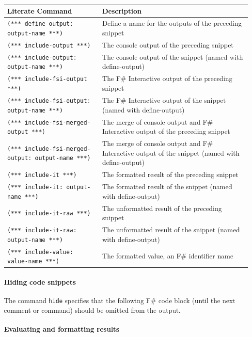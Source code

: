 \documentclass{article}
\begin{document}
\begin{tabular}{|l|l|}\hline
\textbf{Literate Command} & \textbf{Description}\\ \hline\hline
\texttt{(*** define-output: output-name ***)} & Define a name for the outputs of the preceding snippet\\ \hline
\texttt{(*** include-output ***)} & The console output of the preceding snippet\\ \hline
\texttt{(*** include-output: output-name ***)} & The console output of the snippet (named with define-output)\\ \hline
\texttt{(*** include-fsi-output ***)} & The F\# Interactive output of the preceding snippet\\ \hline
\texttt{(*** include-fsi-output: output-name ***)} & The F\# Interactive output of the snippet (named with define-output)\\ \hline
\texttt{(*** include-fsi-merged-output ***)} & The merge of console output and F\# Interactive output of the preceding snippet\\ \hline
\texttt{(*** include-fsi-merged-output: output-name ***)} & The merge of console output and F\# Interactive output of the snippet (named with define-output)\\ \hline
\texttt{(*** include-it ***)} & The formatted result of the preceding snippet\\ \hline
\texttt{(*** include-it: output-name ***)} & The formatted result of the snippet (named with define-output)\\ \hline
\texttt{(*** include-it-raw ***)} & The unformatted result of the preceding snippet\\ \hline
\texttt{(*** include-it-raw: output-name ***)} & The unformatted result of the snippet (named with define-output)\\ \hline
\texttt{(*** include-value: value-name ***)} & The formatted value, an F\# identifier name\\ \hline
\end{tabular}

\paragraph{Hiding code snippets}



The command \texttt{hide} specifies that the following F\# code block (until the next comment or command) should be
omitted from the output.
\paragraph{Evaluating and formatting results}
\end{document}
